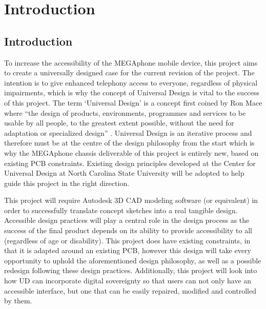 
\chapter{Introduction}\label{chapter:firstchapter} %

\label{Chapter1} %


\section{Introduction}\label{sec:firstsection}


To increase the accessibility of the MEGAphone mobile device, this project aims to create a universally designed case for the current revision of the project.
The intention is to give enhanced telephony access to everyone, regardless of physical impairments, which is why the concept of Universal Design is vital to the success of this project. 
The term ‘Universal Design’ is a concept first coined by Ron Mace where “the design of products, environments, programmes and services to be usable by all people, to the greatest extent possible, without the need for adaptation or specialized design” \cite{nda}. 
Universal Design is an iterative process and therefore must be at the centre of the design philosophy from the start \cite{incldesign} which is why the MEGAphone chassis deliverable of this project is entirely new, based on existing PCB constraints.
Existing design principles developed at the Center for Universal Design at North Carolina State University \cite{sevenprinciples} will be adopted to help guide this project in the right direction.

This project will require Autodesk 3D CAD modeling software (or equivalent) in order to successfully translate concept sketches into a real tangible design. 
Accessible design practices will play a central role in the design process as the success of the final product depends on its ability to provide accessibility to all (regardless of age or disability). 
This project does have existing constraints, in that it is adapted around an existing PCB, however this design will take every opportunity to uphold the aforementioned design philosophy, as well as a possible redesign following these design practices.
Additionally, this project will look into how UD can incorporate digital sovereignty so that users can not only have an accessible interface, but one that can be easily repaired, modified and controlled by them.

